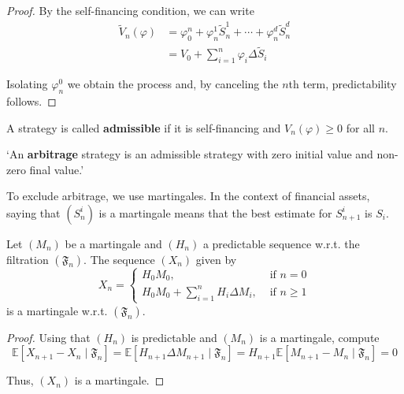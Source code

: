 \begin{proof}
    By the self-financing condition, we can write 
    \begin{equation*}
        \begin{aligned}
            \tilde{V}_n(\varphi) &= \varphi_0^n + \varphi_n^1 \tilde{S}_n^1 + \cdots + \varphi_n^d \tilde{S}_n^d \\
            &= V_0 + \sum_{i=1}^{n} \varphi_i \Delta \tilde{S}_i 
        \end{aligned}
    \end{equation*}

    Isolating $\varphi_n^0$ we obtain the process and, by canceling the $n$th term, predictability follows.
\end{proof}

\begin{definition}
    A strategy is called \textbf{admissible} if it is self-financing and $V_n(\varphi) \geq 0$ for all $n$. 
\end{definition}

\begin{definition}[Arbitrage]
    `An \textbf{arbitrage} strategy is an admissible strategy with zero initial value and non-zero final value.'
\end{definition}

To exclude arbitrage, we use martingales. In the context of financial assets, saying that $(S_n^i)$ is a martingale means that the best estimate for $S_{n+1}^i$ is $S_i$. 

\begin{proposition}\label{prop:1.2.3}
    Let $(M_n)$ be a martingale and $(H_n)$ a predictable sequence w.r.t. the filtration $(\mathfrak{F}_n)$. The sequence $(X_n)$ given by
    \begin{equation*}
        X_n =
        \begin{cases}
            H_0 M_0, & \text{ if } n = 0 \\
            H_0 M_0 + \sum_{i=1}^{n} H_i \Delta M_i, & \text{ if } n \geq 1
        \end{cases}
    \end{equation*}
    is a martingale w.r.t. $(\mathfrak{F}_n)$.
\end{proposition}

\begin{proof}
    Using that $(H_n)$ is predictable and $(M_n)$ is a martingale, compute 
    \begin{equation*}
        \mathbb{E}[X_{n+1} - X_n \mid \mathfrak{F}_n] = \mathbb{E}[H_{n+1} \Delta M_{n+1} \mid \mathfrak{F}_n] = H_{n+1} \mathbb{E} [ M_{n+1} - M_n \mid \mathfrak{F}_n] = 0
    \end{equation*}

    Thus, $(X_n)$ is a martingale.
\end{proof}

